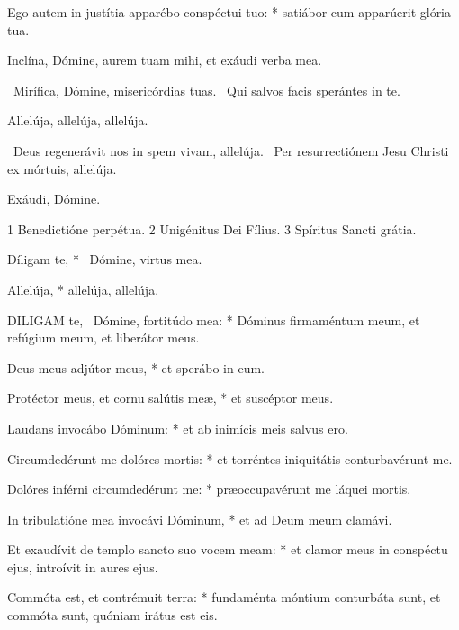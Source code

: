 Ego autem in justítia apparébo conspéctui tuo: * satiábor cum apparúerit glória tua.

 Inclína, Dómine, aurem tuam mihi, et exáudi verba mea.


\V\ Mirífica, Dómine, misericórdias tuas. \R\ Qui salvos facis sperántes in te.


 Allelúja, allelúja, allelúja.

\V\ Deus regenerávit nos in spem vivam, allelúja. \R\ Per resurrectiónem Jesu Christi ex mórtuis, allelúja.

 Exáudi, Dómine.

 1 Benedictióne perpétua. 2 Unigénitus Dei Fílius. 3 Spíritus Sancti grátia.



 Díligam te, * \textdagger\ Dómine, virtus mea.


 Allelúja, * allelúja, allelúja.


\lettrine[lines=2]{D}{ILIGAM} te, \textdagger\ Dómine, fortitúdo mea: * Dóminus firmaméntum meum, et refúgium meum, et liberátor meus.

Deus meus adjútor meus, * et sperábo in eum.

Protéctor meus, et cornu salútis meæ, * et suscéptor meus.

Laudans invocábo Dóminum: * et ab inimícis meis salvus ero.

Circumdedérunt me dolóres mortis: * et torréntes iniquitátis conturbavérunt me.

Dolóres inférni circumdedérunt me: * præoccupavérunt me láquei mortis.

In tribulatióne mea invocávi Dóminum, * et ad Deum meum clamávi.

Et exaudívit de templo sancto suo vocem meam: * et clamor meus in conspéctu ejus, introívit in aures ejus.

Commóta est, et contrémuit terra: * fundaménta móntium conturbáta sunt, et commóta sunt, quóniam irátus est eis.

